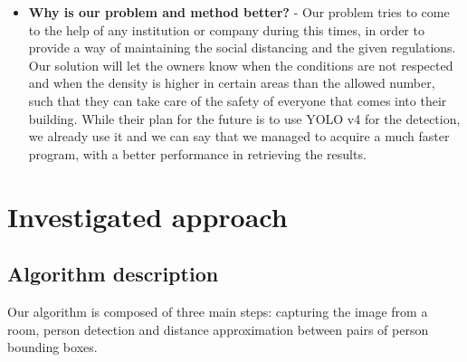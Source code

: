 \documentclass[runningheads,a4paper,11pt]{report}
\begin{document}
\begin{itemize}
	\item \textbf{Why is our problem and method better?} - Our problem tries to come to the help of any institution or company during this times, in order to provide a way of maintaining the social distancing and the given regulations. Our solution will let the owners know when the conditions are not respected and when the density is higher in certain areas than the allowed number, such that they can take care of the safety of everyone that comes into their building. While their plan for the future is to use YOLO v4 for the detection, we already use it and we can say that we managed to acquire a much faster program, with a better performance in retrieving the results.
\end{itemize}


\chapter{Investigated approach}
\label{chapter:proposedApproach}

\section{Algorithm description}
\label{section:solution}
Our algorithm is composed of three main steps: capturing the image from a room, person detection and distance approximation between pairs of person bounding boxes.
\end{document}
